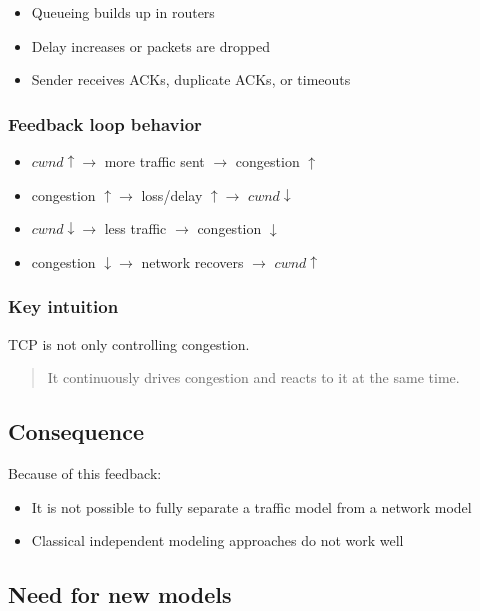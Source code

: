 \begin{itemize}
    \item Queueing builds up in routers
    \item Delay increases or packets are dropped
    \item Sender receives ACKs, duplicate ACKs, or timeouts
\end{itemize}

\subsubsection*{Feedback loop behavior}

\begin{itemize}
    \item $cwnd \uparrow \rightarrow$ more traffic sent $\rightarrow$ congestion $\uparrow$
    \item congestion $\uparrow \rightarrow$ loss/delay $\uparrow \rightarrow$ $cwnd \downarrow$
    \item $cwnd \downarrow \rightarrow$ less traffic $\rightarrow$ congestion $\downarrow$
    \item congestion $\downarrow \rightarrow$ network recovers $\rightarrow$ $cwnd \uparrow$
\end{itemize}

\subsubsection*{Key intuition}

TCP is not only controlling congestion.

\begin{quote}
It continuously drives congestion and reacts to it at the same time.
\end{quote}

\subsection*{Consequence}

Because of this feedback:

\begin{itemize}
    \item It is not possible to fully separate a traffic model from a network model
    \item Classical independent modeling approaches do not work well
\end{itemize}

\subsection*{Need for new models}

